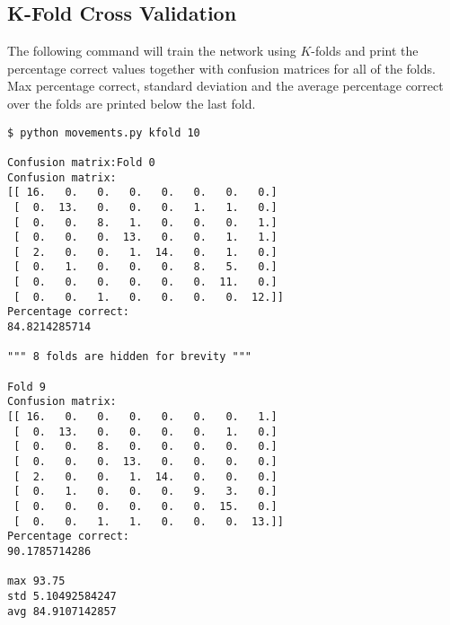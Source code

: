 \documentclass{article}
\begin{document}
\subsection*{K-Fold Cross Validation}

The following command will train the network using $K$-folds and print the percentage correct values together with confusion matrices for all of the folds. Max percentage correct, standard deviation and the average percentage correct over the folds are printed below the last fold.

\begin{verbatim}
$ python movements.py kfold 10

Confusion matrix:Fold 0
Confusion matrix:
[[ 16.   0.   0.   0.   0.   0.   0.   0.]
 [  0.  13.   0.   0.   0.   1.   1.   0.]
 [  0.   0.   8.   1.   0.   0.   0.   1.]
 [  0.   0.   0.  13.   0.   0.   1.   1.]
 [  2.   0.   0.   1.  14.   0.   1.   0.]
 [  0.   1.   0.   0.   0.   8.   5.   0.]
 [  0.   0.   0.   0.   0.   0.  11.   0.]
 [  0.   0.   1.   0.   0.   0.   0.  12.]]
Percentage correct:
84.8214285714

""" 8 folds are hidden for brevity """

Fold 9
Confusion matrix:
[[ 16.   0.   0.   0.   0.   0.   0.   1.]
 [  0.  13.   0.   0.   0.   0.   1.   0.]
 [  0.   0.   8.   0.   0.   0.   0.   0.]
 [  0.   0.   0.  13.   0.   0.   0.   0.]
 [  2.   0.   0.   1.  14.   0.   0.   0.]
 [  0.   1.   0.   0.   0.   9.   3.   0.]
 [  0.   0.   0.   0.   0.   0.  15.   0.]
 [  0.   0.   1.   1.   0.   0.   0.  13.]]
Percentage correct:
90.1785714286

max 93.75
std 5.10492584247
avg 84.9107142857
\end{verbatim}
\end{document}
